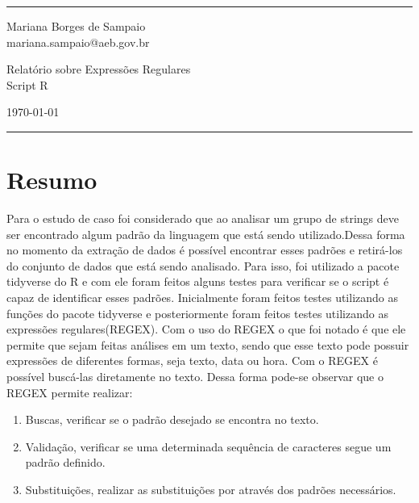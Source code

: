 \documentclass[a4paper]{article}
\begin{document}

\fancyhead[C]{}
\hrule \medskip %
\begin{minipage}{0.295\textwidth} 
\raggedright
\footnotesize
Mariana Borges de Sampaio \hfill\\   
mariana.sampaio@aeb.gov.br
\end{minipage}
\begin{minipage}{0.4\textwidth} 
\centering 
\large 
Relatório sobre Expressões Regulares\\ 
\normalsize 
Script R\\ 
\end{minipage}
\begin{minipage}{0.295\textwidth} 
\raggedleft
\today\hfill\\
\end{minipage}
\medskip\hrule 
\bigskip


\section{Resumo}
Para o estudo de caso foi considerado que ao analisar um grupo de strings deve ser encontrado algum padrão da linguagem que está sendo utilizado.Dessa forma no momento da extração de dados é possível encontrar esses padrões e retirá-los do conjunto de dados que está sendo analisado. Para isso, foi utilizado a pacote tidyverse do R e com ele foram feitos alguns testes para verificar se o script é capaz de identificar esses padrões.
Inicialmente foram feitos testes utilizando as funções do pacote tidyverse e posteriormente foram feitos testes utilizando as expressões regulares(REGEX).
Com o uso do REGEX o que foi notado é que ele permite que sejam feitas análises em um texto, sendo que esse texto pode possuir expressões de diferentes formas, seja texto, data ou hora. Com o REGEX é possível buscá-las diretamente no texto.
Dessa forma pode-se observar que o REGEX permite realizar:
\begin{enumerate}
    \item Buscas, verificar se o padrão desejado se encontra no texto.
    \item Validação, verificar se uma determinada sequência de caracteres segue um padrão definido.
    \item Substituições, realizar as substituições por através dos padrões necessários.
\end{enumerate}
\end{document}
